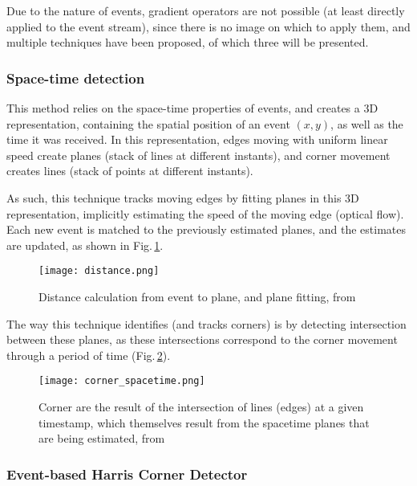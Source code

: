 Due to the nature of events, gradient operators are not possible (at least directly applied to the event stream), since there is no image on which to apply them, and multiple techniques have been proposed, of which three will be presented.

\subsubsection{Space-time detection}
\label{sec:sec2_space_time}

This method relies on the space-time properties of events, and creates a 3D representation, containing the spatial position of an event $(x,y)$, as well as the time it was received. In this representation, edges moving with uniform linear speed create planes (stack of lines at different instants), and corner movement creates lines (stack of points at different instants).

As such, this technique tracks moving edges by fitting planes in this 3D representation, implicitly estimating the speed of the moving edge (optical flow). Each new event is matched to the previously estimated planes, and the estimates are updated, as shown in Fig.\,\ref{fig:sec2_plane_distance}. 

\begin{figure}[ht]
    \centering
    \texttt{[image: distance.png]}
    \caption[Distance calculation from event to plane, and plane fitting]{Distance calculation from event to plane, and plane fitting, from \cite{clady2015asynchronous}}
    \label{fig:sec2_plane_distance}
\end{figure}

The way this technique identifies (and tracks corners) is by detecting intersection between these planes, as these intersections correspond to the corner movement through a period of time (Fig.\,\ref{fig:sec2_corner_spacetime}).

\begin{figure}[ht]
    \centering
    \texttt{[image: corner\_spacetime.png]}
    \caption[Corner detection using spacetime approach]{Corner are the result of the intersection of lines (edges) at a given timestamp, which themselves result from the spacetime planes that are being estimated, from \cite{clady2015asynchronous}}
    \label{fig:sec2_corner_spacetime}
\end{figure}

\subsubsection{Event-based Harris Corner Detector}
\label{sec:sec2_event_harris}

